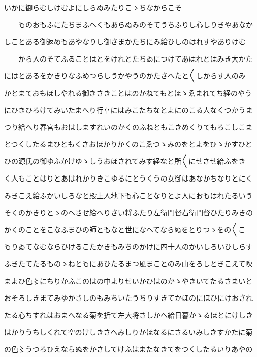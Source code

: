 \documentclass[a4paper,11pt,landscape]{ltjtarticle}
\begin{document}
\par\medskip
いかに御らむしけむよにしらぬみたりこゝちなからこそ
\par\medskip
　　ものおもふにたちまふへくもあらぬみのそてうちふりし心しりきやあなか
\par\medskip
しことある御返めもあやなりし御さまかたちにみ給ひしのはれすやありけむ
\par\medskip
　　から人のそてふることはとをけれとたちゐにつけてあはれとはみき大かた
\par\medskip
にはとあるをかきりなふめつらしうかやうのかたさへたと〱しからす人のみ
\par\medskip
かとまておもほしやれる御きさきことはのかねてもとほゝゑまれてち経のやう
\par\medskip
にひきひろけてみいたまへり行幸にはみこたちなとよにのこる人なくつかうま
\par\medskip
つり給へり春宮もおはしますれいのかくのふねともこきめくりてもろこしこま
\par\medskip
とつくしたるまひともくさおほかりかくのこゑつゝみのをとよをひゝかすひと
\par\medskip
ひの源氏の御ゆふかけゆゝしうおほされてみす経なと所〱にせさせ給ふをき
\par\medskip
く人もことはりとあはれかりきこゆるにとうくうの女御はあなかちなりとにく
\par\medskip
みきこえ給ふかいしろなと殿上人地下も心ことなりとよ人におもはれたるいう
\par\medskip
そくのかきりとゝのへさせ給へりさい将ふたり左衛門督右衛門督ひたりみきの
\par\medskip
かくのことをこなふまひの師ともなと世になへてならぬをとりつゝをの〱こ
\par\medskip
もりゐてなむならひけるこたかきもみちのかけに四十人のかいしろいひしらす
\par\medskip
ふきたてたるものゝねともにあひたるまつ風まことのみ山をろしときこえて吹
\par\medskip
まよひ色〻にちりかふこのはの中よりせいかひはのかゝやきいてたるさまいと
\par\medskip
おそろしきまてみゆかさしのもみちいたうちりすきてかほのにほひにけおされ
\par\medskip
たる心ちすれはおまへなる菊を折て左大将さしかへ給日暮かゝるほとにけしき
\par\medskip
はかりうちしくれて空のけしきさへみしりかほなるにさるいみしきすかたに菊
\par\medskip
の色〻うつろひえならぬをかさしてけふはまたなきてをつくしたるいりあやの
\par\medskip
\end{document}
